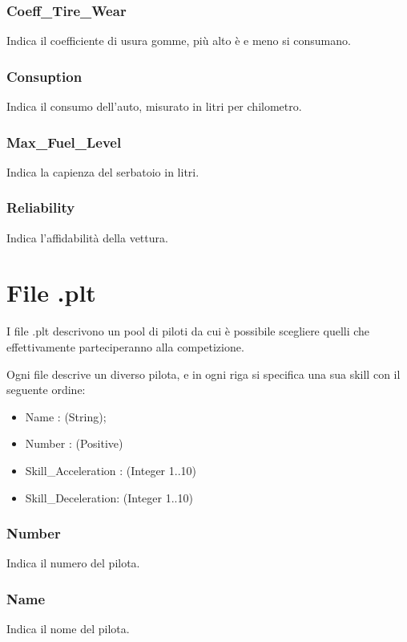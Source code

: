 \documentclass[a4paper,11pt, twoside, openright]{book}
\begin{document}
	\subsubsection{Coeff\_Tire\_Wear}
	  Indica il coefficiente di usura gomme, più alto è e meno si consumano.

	\subsubsection{Consuption} 
	  Indica il consumo dell'auto, misurato in litri per chilometro.

	\subsubsection{Max\_Fuel\_Level}
	  Indica la capienza del serbatoio in litri.
	  
	\subsubsection{Reliability}
	  Indica l'affidabilità della vettura.
      
      \section{File .plt}
	I file .plt descrivono un pool di piloti da cui è possibile scegliere quelli che effettivamente parteciperanno alla
	competizione.
	
	Ogni file descrive un diverso pilota, e in ogni riga si specifica una sua skill con il seguente ordine:
	
	\begin{itemize}
	  \item Name : (String);
	  \item Number : (Positive)
	  \item Skill\_Acceleration : (Integer 1..10)
	  \item Skill\_Deceleration: (Integer 1..10)
	\end{itemize}

	\subsubsection{Number}
	  Indica il numero del pilota.

	\subsubsection{Name}
	  Indica il nome del pilota.
\end{document}
